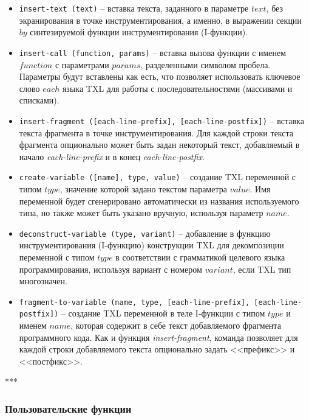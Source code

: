 \begin{itemize}[noitemsep]
  \item \lstinline{insert-text (text)} --
  вставка текста, заданного в параметре $text$, без экранирования в точке инструментирования, а именно, в выражении секции $by$ синтезируемой функции инструментирования (I-функции).

  \item \lstinline{insert-call (function, params)} --
  вставка вызова функции с именем $function$ с параметрами $params$, разделенными символом пробела. Параметры будут вставлены как есть, что позволяет использовать ключевое слово $each$ языка TXL для работы с последовательностями (массивами и списками).

  \item \lstinline{insert-fragment ([each-line-prefix], [each-line-postfix])} --
  вставка текста фрагмента в точке инструментирования. Для каждой строки текста фрагмента опционально может быть задан некоторый текст, добавляемый в начало \textit{each-line-prefix} и в конец \textit{each-line-postfix}.

  \item \lstinline{create-variable ([name], type, value)} --
  создание TXL переменной с типом $type$, значение которой задано текстом параметра $value$. Имя переменной будет сгенерировано автоматически из названия используемого типа, но также может быть указано вручную, используя параметр $name$.

  \item \lstinline{deconstruct-variable (type, variant)} --
  добавление в функцию инструментирования (I-функцию) конструкции TXL для декомпозиции переменной с типом $type$ в соответствии с грамматикой целевого языка программирования, используя вариант с номером $variant$, если TXL тип многозначен.

  \item \lstinline{fragment-to-variable (name, type, [each-line-prefix], [each-line-postfix])} --
  создание TXL переменной в теле I-функции с типом $type$ и именем $name$, которая содержит в себе текст добавляемого фрагмента программного кода. Как и функция \textit{insert-fragment}, команда позволяет для каждой строки добавляемого текста опционально задать <<префикс>> и <<постфикс>>.
\end{itemize}

***

\subsubsection{Пользовательские функции}

